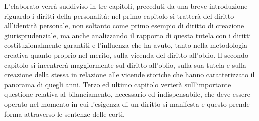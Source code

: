 L'elaborato verrà suddiviso in tre capitoli, preceduti da una breve introduzione riguardo i diritti della personalità: nel primo capitolo si tratterà del diritto all'identità personale, non soltanto come primo esempio di diritto di creazione giurisprudenziale, ma anche analizzando il rapporto di questa tutela con i diritti costituzionalmente garantiti e l'influenza che ha avuto, tanto nella metodologia creativa quanto proprio nel merito, sulla vicenda del diritto all'oblio.
Il secondo capitolo si incentrerà maggiormente sul diritto all'oblio, sulla sua tutela e sulla creazione della stessa in relazione alle vicende storiche che hanno caratterizzato il panorama di quegli anni.
Terzo ed ultimo capitolo verterà sull'importante questione relativa al bilanciamento, necessario ed indispensabile, che deve essere operato nel momento in cui l'esigenza di un diritto si manifesta e questo prende forma attraverso le sentenze delle corti.

